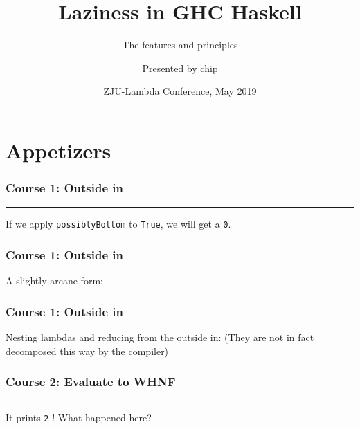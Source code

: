 \documentclass{beamer}
\title[Laziness in GHC Haskell]
{Laziness in GHC Haskell}
\subtitle{The features and principles}
\author[chip]
{Presented by chip}
\institute[ZJU]
{
  ZJU Lambda\\
  From here to World
}
\date[ZJU-Lambda 2019]
{ZJU-Lambda Conference, May 2019}
\newcommand{\inlinehaskell}[1]{\texttt{#1}}
\begin{document}
\frame{\titlepage}


\section{Appetizers}

\begin{frame}
\frametitle{Course 1: Outside in}

\par\noindent\rule{0.75\textwidth}{1.0pt}
\newline\newline
If we apply \inlinehaskell{possiblyBottom} to \inlinehaskell{True}, we will get a \inlinehaskell{0}.

\end{frame}


\begin{frame}
\frametitle{Course 1: Outside in}

A slightly arcane form:\newline
{}

\end{frame}


\begin{frame}
\frametitle{Course 1: Outside in}

Nesting lambdas and reducing from the outside in:\newline
(They are not in fact decomposed this way by the compiler)\newline
{}

\end{frame}


\begin{frame}
\frametitle{Course 2: Evaluate to WHNF}

\par\noindent\rule{0.7\textwidth}{1.0pt}
\newline\newline
It prints \inlinehaskell{2} !
\newline
What happened here?

\end{frame}
\end{document}
